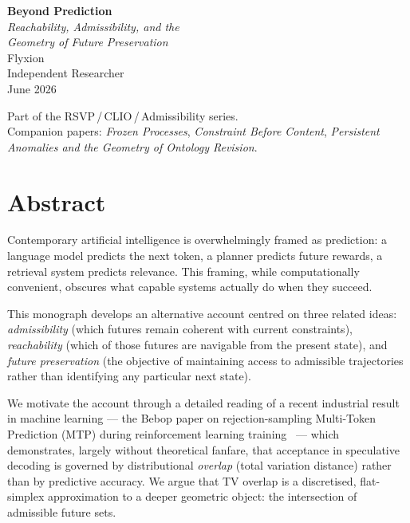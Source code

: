 \documentclass[11pt, a4paper, openany]{book}
\theoremstyle{plain}
\theoremstyle{definition}
\theoremstyle{remark}
\begin{document}
\frontmatter

\begin{titlepage}
  \vspace*{40mm}
  \begin{center}
    {\Huge\bfseries Beyond Prediction}\\[6mm]
    {\Large\itshape Reachability, Admissibility, and the\\[2mm]
    Geometry of Future Preservation}\\[18mm]
    {\large Flyxion}\\[4mm]
    {\normalsize Independent Researcher}\\[14mm]
    {\large June 2026}
  \end{center}
  \vfill
  \begin{center}
    \small
    Part of the RSVP\,/\,CLIO\,/\,Admissibility series.\\
    Companion papers: \emph{Frozen Processes},
    \emph{Constraint Before Content},
    \emph{Persistent Anomalies and the Geometry of Ontology Revision}.
  \end{center}
\end{titlepage}

\chapter*{Abstract}

Contemporary artificial intelligence is overwhelmingly framed as prediction:
a language model predicts the next token, a planner predicts future rewards,
a retrieval system predicts relevance.
This framing, while computationally convenient, obscures what capable systems
actually do when they succeed.

This monograph develops an alternative account centred on three related ideas:
\emph{admissibility} (which futures remain coherent with current constraints),
\emph{reachability} (which of those futures are navigable from the present state),
and \emph{future preservation} (the objective of maintaining access to admissible
trajectories rather than identifying any particular next state).

We motivate the account through a detailed reading of a recent industrial result
in machine learning --- the Bebop paper on rejection-sampling Multi-Token Prediction
(MTP) during reinforcement learning training~\cite{li2026breaking} --- which
demonstrates, largely without theoretical fanfare, that acceptance in speculative
decoding is governed by distributional \emph{overlap} (total variation distance)
rather than by predictive accuracy.
We argue that TV overlap is a discretised, flat-simplex approximation to a deeper
geometric object: the intersection of admissible future sets.
\end{document}
